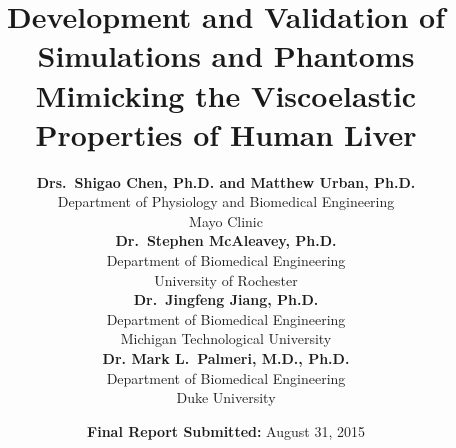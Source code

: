 \documentclass[11pt]{article}
\title{Development and Validation of Simulations and Phantoms Mimicking the
    Viscoelastic Properties of Human Liver}
\author{\textbf{Drs.\ Shigao Chen, Ph.D. and Matthew Urban, Ph.D.}\\
        Department of Physiology and Biomedical Engineering\\
        Mayo Clinic \vspace*{0.1in}\\
        \textbf{Dr.\ Stephen McAleavey, Ph.D.}\\
        Department of Biomedical Engineering\\
        University of Rochester \vspace*{0.1in}\\
        \textbf{Dr.\ Jingfeng Jiang, Ph.D.}\\
        Department of Biomedical Engineering\\
        Michigan Technological University \vspace*{0.1in}\\
        \textbf{Dr. Mark L.\ Palmeri, M.D., Ph.D.}\\
        Department of Biomedical Engineering\\
        Duke University}
\date{\textbf{Final Report Submitted:} August 31, 2015}
\begin{document}
\maketitle

\tableofcontents















\pagebreak


\end{document}
